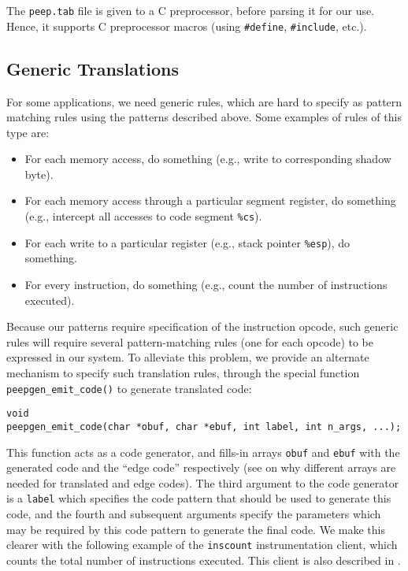 \documentclass[9pt]{article}
\begin{document}
The {\tt peep.tab} file is given to a C preprocessor, before parsing it
for our use. Hence, it supports C preprocessor macros (using {\tt \#define},
{\tt \#include}, etc.).

\subsection{Generic Translations}
For some applications, we need generic rules, which are hard to specify
as pattern matching rules using the patterns described above.
Some examples of rules of this type are:
\begin{itemize}
\item For each memory access, do something (e.g., write to corresponding
shadow byte).
\item For each memory access through a particular segment register, do
something (e.g., intercept all accesses to code segment {\tt \%cs}).
\item For each write to a particular register (e.g., stack pointer {\tt \%esp}),
do something.
\item For every instruction, do something (e.g., count the number of
instructions executed).
\end{itemize}

Because our patterns require specification of the instruction opcode, such
generic rules will require several pattern-matching rules (one for each
opcode) to be expressed in our system. To alleviate this problem, we
provide an alternate mechanism to specify such translation rules, through
the special function {\tt peepgen\_emit\_code()} to generate translated code:
\begin{verbatim}
void
peepgen_emit_code(char *obuf, char *ebuf, int label, int n_args, ...);
\end{verbatim}
This function acts as a code generator, and fills-in arrays
{\tt obuf} and {\tt ebuf}
with the generated code and the ``edge code'' respectively
(see \cite{sosp2013} on why different arrays are needed for translated and
edge codes). The third argument to the code generator is a {\tt label} which
specifies the code pattern that should be used to
generate this code, and the fourth and subsequent arguments
specify the parameters which may be required by this code pattern to generate
the final code. We make this clearer with the following example of
the {\tt inscount} instrumentation client, which
counts the total number of instructions executed. This client is also
described in \cite{sosp13}.
\end{document}
